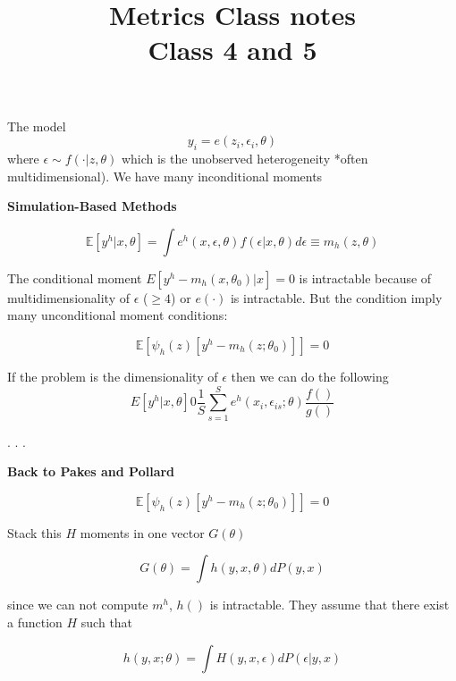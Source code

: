 \documentclass[12pt]{article}
\title{\Large{\textbf{Metrics Class notes}} \\
Class 4 and 5}
\begin{document}
\maketitle

The model 
\begin{equation*}
	y_i = e(z_i, \epsilon_i, \theta)
\end{equation*}
where $\epsilon \sim f(\cdot | z, \theta)$ which is the unobserved heterogeneity *often multidimensional). We have many inconditional moments



\textbf{Simulation-Based Methods}

\begin{equation*}
	\mathbb{E}[y^h | x, \theta] = \int e^h(x, \epsilon, \theta) f(\epsilon | x, \theta) d \epsilon \equiv m_h(z,\theta)
\end{equation*}

The conditional moment $E[y^h-m_h(x,\theta_0) | x] = 0$ is intractable because of multidimensionality of $\epsilon$ ($\geq 4$) or $e(\cdot)$ is intractable. But the condition imply many unconditional moment conditions:

\begin{equation*}
	\mathbb{E}[\psi_h(z) [y^h - m_h(z;\theta_0)]] = 0
\end{equation*}

If the problem is the dimensionality of $\epsilon$ then we can do the following
\begin{equation*}
	E[y^h| x, \theta] 0 \frac{1}{S} \sum^S_{s = 1} e^h(x_i, \epsilon_{is}; \theta) \frac{f()}{g()}  
\end{equation*}

.
.
.

\textbf{Back to Pakes and Pollard}

\begin{equation*}
	\mathbb{E}[\psi_h(z) [y^h - m_h(z;\theta_0)]] = 0
\end{equation*}

Stack this $H$ moments in one vector $G(\theta)$

\begin{equation*}
	G(\theta) = \int h(y,x,\theta) dP(y,x)
\end{equation*}

since we can not compute $m^h$, $h()$ is intractable. They assume that there exist a function $H$ such that

\begin{equation*}
	h(y,x;\theta) = \int H(y,x,\epsilon)	 dP(\epsilon | y, x)
\end{equation*}
\end{document}
